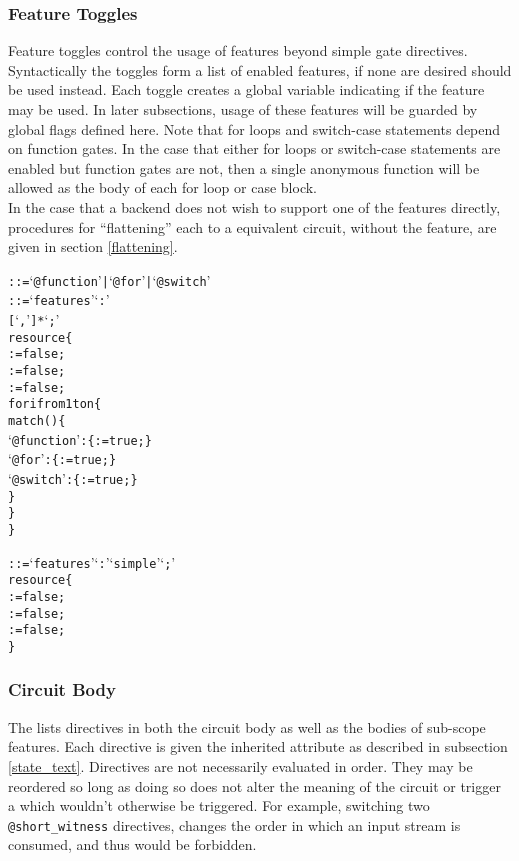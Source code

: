 \subsubsection*{Feature Toggles}
Feature toggles control the usage of features beyond simple gate directives.
Syntactically the toggles form a list of enabled features, if none are desired  should be used instead.
Each toggle creates a global variable indicating if the feature may be used.
In later subsections, usage of these features will be guarded by global flags defined here.
Note that for loops and switch-case statements depend on function gates.
In the case that either for loops or switch-case statements are enabled but function gates are not, then a single anonymous function will be allowed as the body of each for loop or case block.\\

In the case that a backend does not wish to support one of the features directly, procedures for ``flattening'' each to a equivalent circuit, without the feature, are given in section \ref{flattening}.

\begin{alltt}\ttSyn
   ::= `@function' | `@for' | `@switch'
   ::= `features' `:'
                       [ `,'  ]*  `;'\ttSem
  resource \{
     := false;
     := false;
     := false;
    for i from 1 to n \{
      match() \{
        `@function': \{  := true; \}
        `@for':      \{  := true; \}
        `@switch':   \{  := true; \}
      \}
    \}
  \}\ttSyn

   ::= `features' `:' `simple' `;'\ttSem
  resource \{
     := false;
     := false;
     := false;
  \}
\end{alltt}

\subsubsection*{Circuit Body}
The  lists directives in both the circuit body as well as the bodies of sub-scope features.
Each directive is given the inherited  attribute as described in subsection \ref{state_text}.
Directives are not necessarily evaluated in order.
They may be reordered so long as doing so does not alter the meaning of the circuit or trigger a  which wouldn't otherwise be triggered.
For example, switching two \texttt{@short\_witness} directives, changes the order in which an input stream is consumed, and thus would be forbidden.\\

